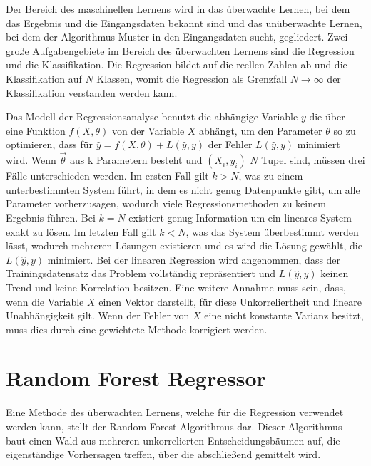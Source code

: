 Der Bereich des maschinellen Lernens wird in das überwachte Lernen, bei dem das Ergebnis und die Eingangsdaten bekannt
sind und das unüberwachte Lernen, bei dem der Algorithmus Muster in den Eingangsdaten sucht, gegliedert.
Zwei große Aufgabengebiete im Bereich des überwachten Lernens sind die Regression und die Klassifikation. Die Regression bildet
auf die reellen Zahlen ab und die Klassifikation auf $N$ Klassen, womit die Regression als Grenzfall $N \to \infty$ der Klassifikation
verstanden werden kann.

Das Modell der Regressionsanalyse benutzt die abhängige Variable $y$ die über eine Funktion $f(X,\theta)$ von der Variable $X$ abhängt, um
den Parameter $\theta$ so zu optimieren, dass für $\hat{y} = f(X,\theta) + L(\hat{y},y)$ der Fehler
$L(\hat{y},y)$ minimiert wird.
Wenn $\vec{\theta}$ aus k Parametern besteht und $(X_i,y_i)$ $N$ Tupel sind, müssen drei Fälle unterschieden werden.
Im ersten Fall gilt $k>N$, was zu einem unterbestimmten System führt, in dem es nicht genug Datenpunkte gibt, um alle Parameter
vorherzusagen, wodurch viele Regressionsmethoden zu keinem Ergebnis führen.
Bei $k = N$ existiert genug Information um ein lineares System exakt zu lösen.
Im letzten Fall gilt $k<N$, was das System überbestimmt werden lässt, wodurch mehreren Lösungen existieren und
es wird die Lösung gewählt, die $L(\hat{y},y)$ minimiert.
Bei der linearen Regression wird angenommen, dass der Trainingsdatensatz das Problem vollständig repräsentiert und $L(\hat{y},y)$ keinen Trend
und keine Korrelation besitzen.
Eine weitere Annahme muss sein, dass, wenn die Variable $X$ einen Vektor darstellt, für diese Unkorreliertheit und lineare Unabhängigkeit gilt.
Wenn der Fehler von $X$ eine nicht konstante Varianz besitzt, muss dies durch eine gewichtete Methode korrigiert werden.

\section{Random Forest Regressor}
\label{sec:RF}

Eine Methode des überwachten Lernens, welche für die Regression verwendet werden kann, stellt der Random Forest Algorithmus dar. Dieser Algorithmus baut
einen Wald aus mehreren unkorrelierten Entscheidungsbäumen auf, die eigenständige Vorhersagen treffen, über die abschließend gemittelt wird.

